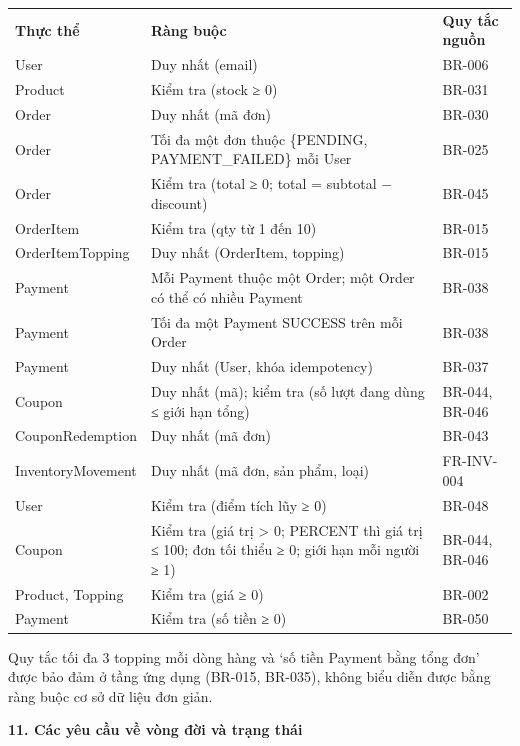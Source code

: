 \documentclass[11pt,a4paper,oneside]{report}
\begin{document}
\begin{longtable}[]{@{}
  >{\raggedright\arraybackslash}p{}
  >{\raggedright\arraybackslash}p{}
  >{\raggedright\arraybackslash}p{}@{}}
\toprule\noalign{}
\endhead
\bottomrule\noalign{}
\endlastfoot
\textbf{Thực thể} & \textbf{Ràng buộc} & \textbf{Quy tắc nguồn} \\
User & Duy nhất (email) & BR-006 \\
Product & Kiểm tra (stock ≥ 0) & BR-031 \\
Order & Duy nhất (mã đơn) & BR-030 \\
Order & Tối đa một đơn thuộc \{PENDING, PAYMENT\_FAILED\} mỗi User & BR-025 \\
Order & Kiểm tra (total ≥ 0; total = subtotal − discount) & BR-045 \\
OrderItem & Kiểm tra (qty từ 1 đến 10) & BR-015 \\
OrderItemTopping & Duy nhất (OrderItem, topping) & BR-015 \\
Payment & Mỗi Payment thuộc một Order; một Order có thể có nhiều Payment & BR-038 \\
Payment & Tối đa một Payment SUCCESS trên mỗi Order & BR-038 \\
Payment & Duy nhất (User, khóa idempotency) & BR-037 \\
Coupon & Duy nhất (mã); kiểm tra (số lượt đang dùng ≤ giới hạn tổng) & BR-044, BR-046 \\
CouponRedemption & Duy nhất (mã đơn) & BR-043 \\
InventoryMovement & Duy nhất (mã đơn, sản phẩm, loại) & FR-INV-004 \\
User & Kiểm tra (điểm tích lũy ≥ 0) & BR-048 \\
Coupon & Kiểm tra (giá trị \textgreater{} 0; PERCENT thì giá trị ≤ 100; đơn tối thiểu ≥ 0; giới hạn mỗi người ≥ 1) & BR-044, BR-046 \\
Product, Topping & Kiểm tra (giá ≥ 0) & BR-002 \\
Payment & Kiểm tra (số tiền ≥ 0) & BR-050 \\
\end{longtable}

Quy tắc tối đa 3 topping mỗi dòng hàng và `số tiền Payment bằng tổng đơn' được bảo đảm ở tầng ứng dụng (BR-015, BR-035), không biểu diễn được bằng ràng buộc cơ sở dữ liệu đơn giản.

\textbf{11. Các yêu cầu về vòng đời và trạng thái}
\end{document}
